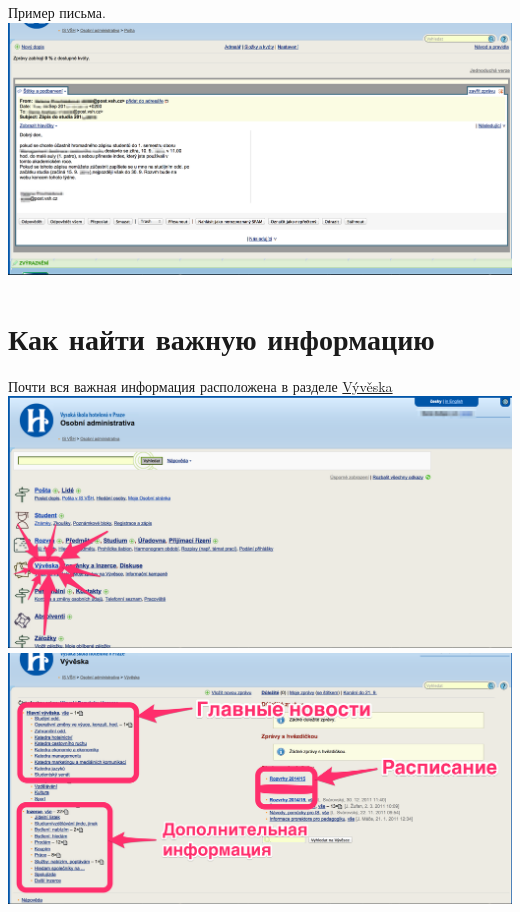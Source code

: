 \documentclass[a4paper,12pt]{article}
\begin{document}
Пример письма. \\

\includegraphics[width=\textwidth]{s10-1}

\newpage

\section{Как найти важную информацию}

Почти вся важная информация расположена в разделе 
\href{https://is.vsh.cz/auth/vyveska/}{Vývěska} \\

\includegraphics[width=\textwidth]{s11} \\

\includegraphics[width=\textwidth]{s12} \\
\end{document}
